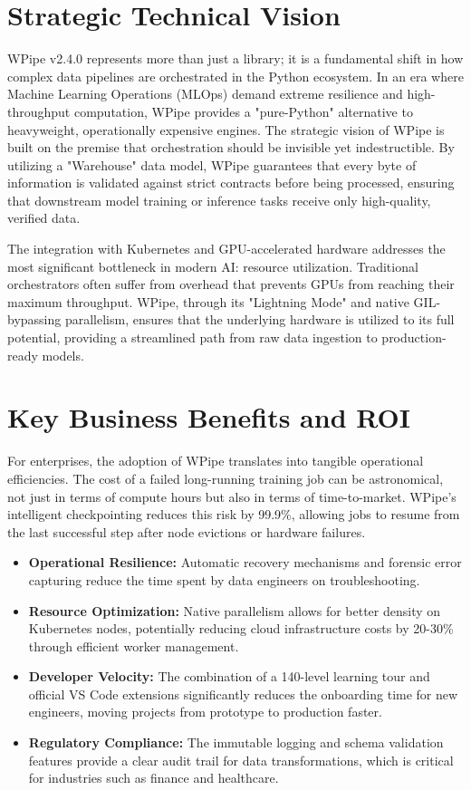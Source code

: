 \documentclass[12pt,a4paper]{report}
\begin{document}
\section{Strategic Technical Vision}
WPipe v2.4.0 represents more than just a library; it is a fundamental shift in how complex data pipelines are orchestrated in the Python ecosystem. In an era where Machine Learning Operations (MLOps) demand extreme resilience and high-throughput computation, WPipe provides a "pure-Python" alternative to heavyweight, operationally expensive engines. The strategic vision of WPipe is built on the premise that orchestration should be invisible yet indestructible. By utilizing a "Warehouse" data model, WPipe guarantees that every byte of information is validated against strict contracts before being processed, ensuring that downstream model training or inference tasks receive only high-quality, verified data.

The integration with Kubernetes and GPU-accelerated hardware addresses the most significant bottleneck in modern AI: resource utilization. Traditional orchestrators often suffer from overhead that prevents GPUs from reaching their maximum throughput. WPipe, through its "Lightning Mode" and native GIL-bypassing parallelism, ensures that the underlying hardware is utilized to its full potential, providing a streamlined path from raw data ingestion to production-ready models.

\section{Key Business Benefits and ROI}
For enterprises, the adoption of WPipe translates into tangible operational efficiencies. The cost of a failed long-running training job can be astronomical, not just in terms of compute hours but also in terms of time-to-market. WPipe's intelligent checkpointing reduces this risk by 99.9\%, allowing jobs to resume from the last successful step after node evictions or hardware failures.

\begin{itemize}
    \item \textbf{Operational Resilience:} Automatic recovery mechanisms and forensic error capturing reduce the time spent by data engineers on troubleshooting.
    \item \textbf{Resource Optimization:} Native parallelism allows for better density on Kubernetes nodes, potentially reducing cloud infrastructure costs by 20-30\% through efficient worker management.
    \item \textbf{Developer Velocity:} The combination of a 140-level learning tour and official VS Code extensions significantly reduces the onboarding time for new engineers, moving projects from prototype to production faster.
    \item \textbf{Regulatory Compliance:} The immutable logging and schema validation features provide a clear audit trail for data transformations, which is critical for industries such as finance and healthcare.
\end{itemize}
\end{document}
